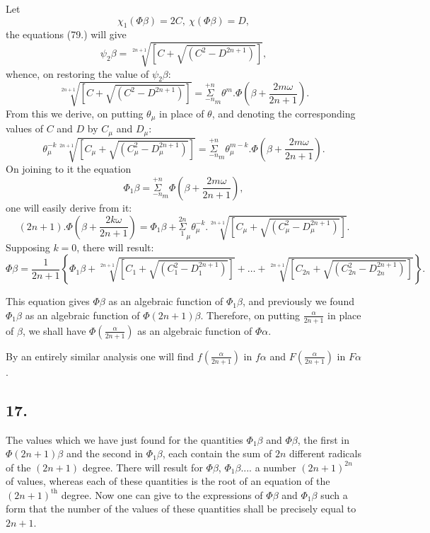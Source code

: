 \documentclass{article}
\begin{document}
Let
\[ \chi_{1}(\Phi\beta)=2C,\ \chi(\Phi\beta)=D, \]
the equations (79.) will give
\[ \psi_{2}\beta=\sqrt[2n+1]{[C+\sqrt{(C^{2}-D^{2n+1})}]}, \]
whence, on restoring the value of $\psi_{2}\beta$:
\[ \sqrt[2n+1]{[C+\sqrt{(C^{2}-D^{2n+1})}]}=\overset{+n}{\underset{-n}{\Sigma}}_{m}\theta^{m}.\Phi\left(\beta+\frac{2m\omega}{2n+1}\right). \tag{82.} \]
From this we derive, on putting $\theta_{\mu}$ in place of $\theta$, and denoting the corresponding values of $C$ and $D$ by $C_{\mu}$ and $D_{\mu}$:
\[ \theta_{\mu}^{-k}\sqrt[2n+1]{[C_{\mu}+\sqrt{(C_{\mu}^{2}-D_{\mu}^{2n+1})}]}=\overset{+n}{\underset{-n}{\Sigma}}_{m}\theta_{\mu}^{m-k}.\Phi\left(\beta+\frac{2m\omega}{2n+1}\right). \]
On joining to it the equation
\[ \Phi_{1}\beta=\overset{+n}{\underset{-n}{\Sigma}}_{m}\Phi\left(\beta+\frac{2m\omega}{2n+1}\right), \]
one will easily derive from it:
\[ (2n+1).\Phi\left(\beta+\frac{2k\omega}{2n+1}\right)=\Phi_{1}\beta+\overset{2n}{\underset{1}{\Sigma}}_{\mu}\theta_{\mu}^{-k}.\sqrt[2n+1]{[C_{\mu}+\sqrt{(C_{\mu}^{2}-D_{\mu}^{2n+1})}]}. \tag{83.} \]
Supposing $k=0$, there will result:
\[ \Phi\beta=\frac{1}{2n+1}\left\{\Phi_{1}\beta+\sqrt[2n+1]{[C_{1}+\sqrt{(C_{1}^{2}-D_{1}^{2n+1})}]}+\ldots+\sqrt[2n+1]{[C_{2n}+\sqrt{(C_{2n}^{2}-D_{2n}^{2n+1})}]}\right\}. \tag{84.} \]


This equation gives $\Phi\beta$ as an algebraic function of $\Phi_{1}\beta$, and previously we found $\Phi_{1}\beta$ as an algebraic function of $\Phi(2n+1)\beta$. Therefore, on putting $\frac{\alpha}{2n+1}$ in place of $\beta$, we shall have $\Phi\left(\frac{\alpha}{2n+1}\right)$ as an algebraic function of $\Phi\alpha$.

By an entirely similar analysis one will find $f\left(\frac{\alpha}{2n+1}\right)$ in $f\alpha$ and $F\left(\frac{\alpha}{2n+1}\right)$ in $F\alpha$.

\subsection*{17.}

The values which we have just found for the quantities $\Phi_{1}\beta$ and $\Phi\beta$, the first in $\Phi(2n+1)\beta$ and the second in $\Phi_{1}\beta$, each contain the sum of $2n$ different radicals of the $(2n+1)$ degree. There will result for $\Phi\beta$, $\Phi_{1}\beta....$ a number $(2n+1)^{2n}$ of values, whereas each of these quantities is the root of an equation of the $(2n+1)^{\text{th}}$ degree. Now one can give to the expressions of $\Phi\beta$ and $\Phi_{1}\beta$ such a form that the number of the values of these quantities shall be precisely equal to $2n+1$.
\end{document}
